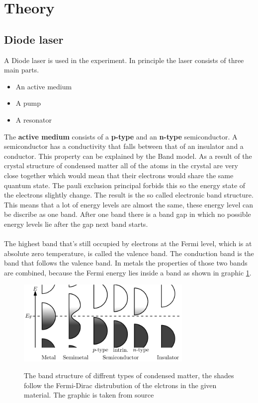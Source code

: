\section{Theory}
\label{sec:Theorie}

\subsection{Diode laser}

A Diode laser is used in the experiment.
In principle the laser consists of three main parts.
\begin{itemize}
    \item An active medium
    \item A pump
    \item A resonator
\end{itemize}
The \textbf{active medium} consists of a \textbf{p-type} and an \textbf{n-type} semiconductor.
A semiconductor has a conductivity that falls between that of an insulator and a conductor.
This property can be explained by the Band model. 
As a result of the crystal structure of condensed matter all of the atoms in the crystal are very close together which would mean that their electrons would share the same quantum state.
The pauli exclusion principal forbids this so the energy state of the electrons slightly change.
The result is the so called electronic band structure.
This means that a lot of energy levels are almost the same, these energy level can be discribe as one band.
After one band there is a band gap in which no possible energy levels lie after the gap next band starts.
\\\\
The highest band that's still occupied by electrons at the Fermi level, which is at absolute zero temperature, is called the valence band.
The conduction band is the band that follows the valence band.
In metals the properties of those two bands are combined, because the Fermi energy lies inside a band as shown in graphic \ref{fig:band_structure}.

\begin{figure}
    \centering
    \caption{The band structure of diffrent types of condensed matter, the shades follow the Fermi-Dirac distrubution of the elctrons in the given material. The graphic is taken from source \cite{wikipedia_valence_conduction_band}}
    \includegraphics[width=0.75\textwidth]{content/data/Band_structure_diffrent_materials}
    \label{fig:band_structure}
\end{figure}

